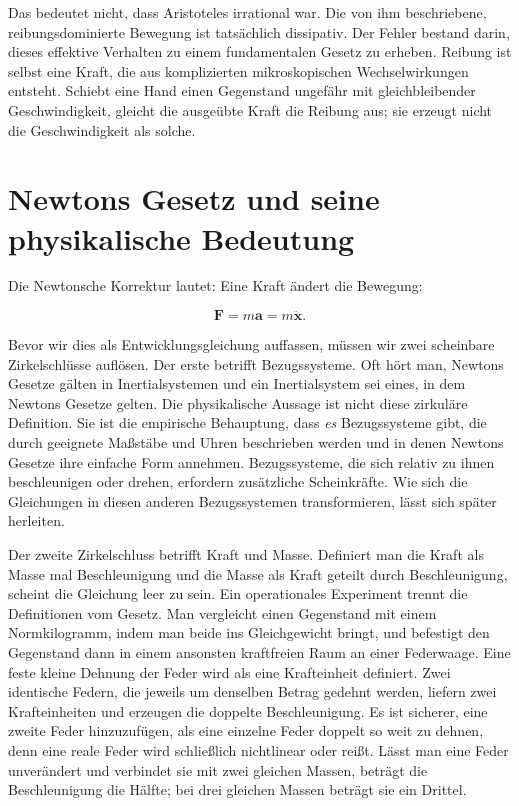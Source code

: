 Das bedeutet nicht, dass Aristoteles irrational war. Die von ihm beschriebene, reibungsdominierte Bewegung ist tatsächlich dissipativ. Der Fehler bestand darin, dieses effektive Verhalten zu einem fundamentalen Gesetz zu erheben. Reibung ist selbst eine Kraft, die aus komplizierten mikroskopischen Wechselwirkungen entsteht. Schiebt eine Hand einen Gegenstand ungefähr mit gleichbleibender Geschwindigkeit, gleicht die ausgeübte Kraft die Reibung aus; sie erzeugt nicht die Geschwindigkeit als solche.

\section{Newtons Gesetz und seine physikalische Bedeutung}

Die Newtonsche Korrektur lautet: Eine Kraft ändert die Bewegung:

\begin{equation}
  \mathbf F=m\mathbf a=m\ddot{\mathbf x}.
  \label{eq:newton-second-law}
\end{equation}

Bevor wir dies als Entwicklungsgleichung auffassen, müssen wir zwei scheinbare Zirkelschlüsse auflösen. Der erste betrifft Bezugssysteme. Oft hört man, Newtons Gesetze gälten in Inertialsystemen und ein Inertialsystem sei eines, in dem Newtons Gesetze gelten. Die physikalische Aussage ist nicht diese zirkuläre Definition. Sie ist die empirische Behauptung, dass \emph{es} Bezugssysteme gibt, die durch geeignete Maßstäbe und Uhren beschrieben werden und in denen Newtons Gesetze ihre einfache Form annehmen. Bezugssysteme, die sich relativ zu ihnen beschleunigen oder drehen, erfordern zusätzliche Scheinkräfte. Wie sich die Gleichungen in diesen anderen Bezugssystemen transformieren, lässt sich später herleiten.

Der zweite Zirkelschluss betrifft Kraft und Masse. Definiert man die Kraft als Masse mal Beschleunigung und die Masse als Kraft geteilt durch Beschleunigung, scheint die Gleichung leer zu sein. Ein operationales Experiment trennt die Definitionen vom Gesetz. Man vergleicht einen Gegenstand mit einem Normkilogramm, indem man beide ins Gleichgewicht bringt, und befestigt den Gegenstand dann in einem ansonsten kraftfreien Raum an einer Federwaage. Eine feste kleine Dehnung der Feder wird als eine Krafteinheit definiert. Zwei identische Federn, die jeweils um denselben Betrag gedehnt werden, liefern zwei Krafteinheiten und erzeugen die doppelte Beschleunigung. Es ist sicherer, eine zweite Feder hinzuzufügen, als eine einzelne Feder doppelt so weit zu dehnen, denn eine reale Feder wird schließlich nichtlinear oder reißt. Lässt man eine Feder unverändert und verbindet sie mit zwei gleichen Massen, beträgt die Beschleunigung die Hälfte; bei drei gleichen Massen beträgt sie ein Drittel.

